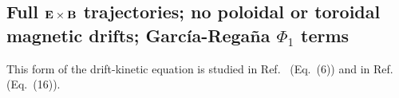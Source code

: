 


\subsection{Full ${\mathbf E}\times{\mathbf B}$ trajectories; no poloidal or toroidal magnetic drifts; Garc\'{i}a-Rega\~{n}a $\Phi_1$ terms}


This form of the drift-kinetic equation is studied in Ref.~\cite{Mollen2018} (Eq.~(6)) and in Ref.~\cite{Regana2017} (Eq.~(16)). 

\newline


